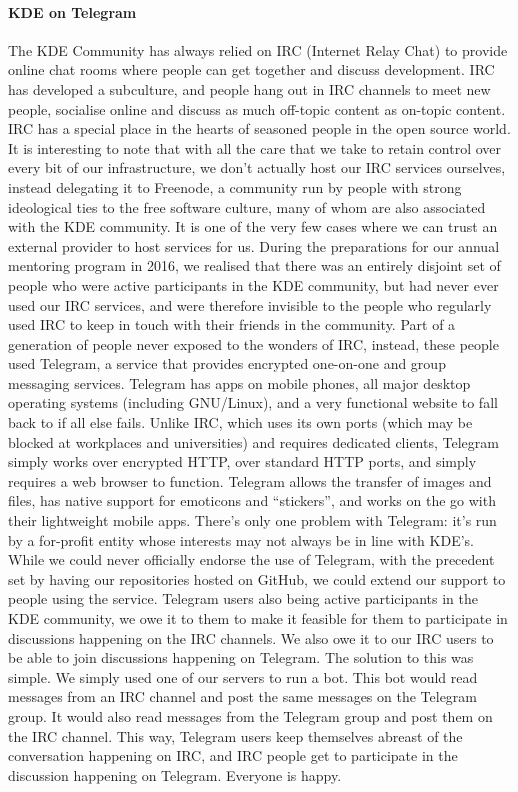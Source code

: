 \paragraph{KDE on Telegram}
The KDE Community has always relied on IRC (Internet Relay Chat) to provide online chat rooms where people can get together and discuss development. IRC has developed a subculture, and people hang out in IRC channels to meet new people, socialise online and discuss as much off-topic content as on-topic content. IRC has a special place in the hearts of seasoned people in the open source world.
It is interesting to note that with all the care that we take to retain control over every bit of our infrastructure, we don’t actually host our IRC services ourselves, instead delegating it to Freenode, a community run by people with strong ideological ties to the free software culture, many of whom are also associated with the KDE community. It is one of the very few cases where we can trust an external provider to host services for us.
During the preparations for our annual mentoring program in 2016, we realised that there was an entirely disjoint set of people who were active participants in the KDE community, but had never ever used our IRC services, and were therefore invisible to the people who regularly used IRC to keep in touch with their friends in the community.
Part of a generation of people never exposed to the wonders of IRC, instead, these people used Telegram, a service that provides encrypted one-on-one and group messaging services. Telegram has apps on mobile phones, all major desktop operating systems (including GNU/Linux), and a very functional website to fall back to if all else fails. Unlike IRC, which uses its own ports (which may be blocked at workplaces and universities) and requires dedicated clients, Telegram simply works over encrypted HTTP, over standard HTTP ports, and simply requires a web browser to function. Telegram allows the transfer of images and files, has native support for emoticons and “stickers”, and works on the go with their lightweight mobile apps. There’s only one problem with Telegram: it’s run by a for-profit entity whose interests may not always be in line with KDE’s.
While we could never officially endorse the use of Telegram, with the precedent set by having our repositories hosted on GitHub, we could extend our support to people using the service. Telegram users also being active participants in the KDE community, we owe it to them to make it feasible for them to participate in discussions happening on the IRC channels. We also owe it to our IRC users to be able to join discussions happening on Telegram.
The solution to this was simple. We simply used one of our servers to run a bot. This bot would read messages from an IRC channel and post the same messages on the Telegram group. It would also read messages from the Telegram group and post them on the IRC channel. This way, Telegram users keep themselves abreast of the conversation happening on IRC, and IRC people get to participate in the discussion happening on Telegram. Everyone is happy.

